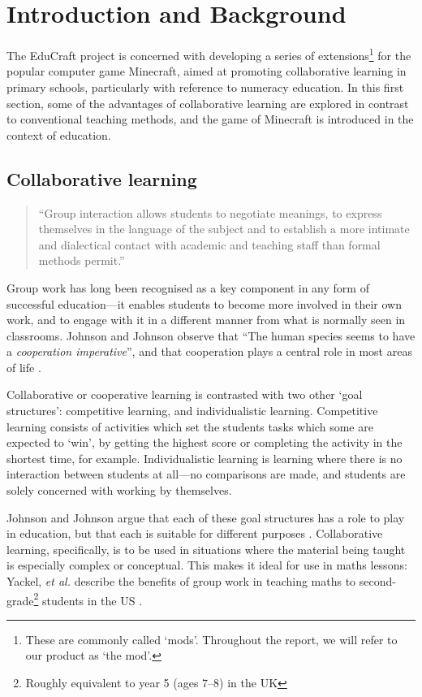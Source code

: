 \chapter{Introduction and Background}
\label{ch:introduction}
The EduCraft project is concerned with developing a series of
extensions\footnote{These are commonly called `mods'. Throughout the report,
we will refer to our product as `the mod'.} for the popular computer game
Minecraft, aimed at promoting collaborative learning in primary schools,
particularly with reference to numeracy education. In this first section, some
of the advantages of collaborative learning are explored in contrast to
conventional teaching methods, and the game of Minecraft is introduced in the
context of education.

\section{Collaborative learning}
\begin{quote}
``Group interaction allows students to negotiate meanings, to express
themselves in the language of the subject and to establish a more intimate
and dialectical contact with academic and teaching staff than formal
methods permit.'' \cite[p.~1]{jacques00}
\end{quote}
Group work has long been recognised as a key component in any form of
successful education---it enables students to become more involved in their
own work, and to engage with it in a different manner from what is normally
seen in classrooms. Johnson and Johnson observe that ``The human species seems
to have a \textit{cooperation imperative}'', and that cooperation plays
a central role in most areas of life \cite[p.~12]{johnson94}.

Collaborative or cooperative learning is contrasted with two other `goal
structures': competitive learning, and individualistic learning. Competitive
learning consists of activities which set the students tasks which some
are expected to `win', by getting the highest score or completing the activity
in the shortest time, for example. Individualistic learning is learning where
there is no interaction between students at all---no comparisons are made,
and students are solely concerned with working by themselves.

Johnson and Johnson argue that each of these goal structures has a role
to play in education, but that each is suitable for different
purposes \cite{johnson94}.  Collaborative learning, specifically, is to
be used in situations where the material being taught is especially
complex or conceptual. This makes it ideal for use in maths lessons:
Yackel, \textit{et al.} describe the benefits of group work in teaching maths
to second-grade\footnote{Roughly equivalent to year 5 (ages 7--8) in the UK}
students in the US \cite{yackel91}.

